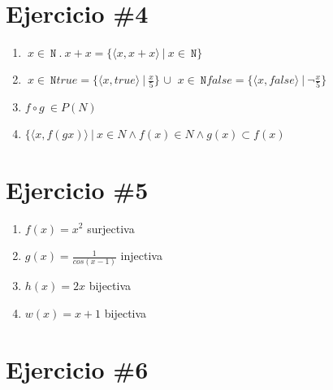 \documentclass{article}
\begin{document}
\section*{Ejercicio \#4}
\begin{enumerate}
    \item $ \ x \in \ \mathtt{N} \ . \ x + x = \{ \langle x , x+x \rangle \ |\ x \in \ \mathtt{N} \} $
    \item $\ x \in \ \mathtt{N} true =\{ \langle x , true \rangle \ |\ \frac{x}{5}\} $ $\cup$ $ \ x \in \ \mathtt{N} false =\{ \langle x , false \rangle \ |\ \neg \frac{x}{5}\}$
    \item $f\circ g \ \in P(N)$
    \item $\{ \langle x, f(gx) \rangle \ |\ x \in N \wedge f(x) \in N   \wedge g(x) \subset f(x)$
\end{enumerate} 
\section*{Ejercicio \#5}
\begin{enumerate}

\item{$f(x)=x^2$} surjectiva 

        \item{$g(x)=\frac{1}{cos(x-1)}$} injectiva

        \item{$h(x)=2x$} bijectiva

        \item{$w(x)=x+1$} bijectiva
\end{enumerate}
\section*{Ejercicio \#6}
 \begin{enumerate}
 \end{enumerate}
\end{document}
